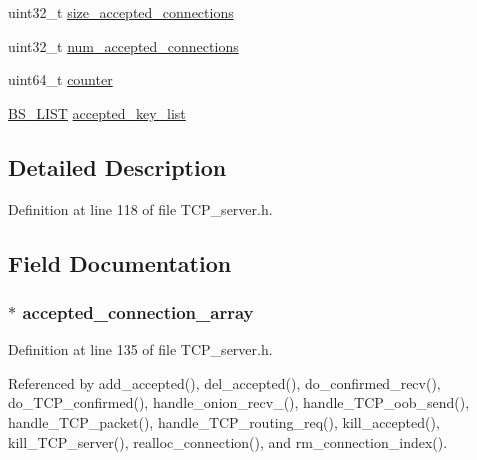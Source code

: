 \begin{DoxyCompactItemize}
\item 
uint32\+\_\+t \hyperlink{struct_t_c_p___server_a6348c77f7067c2876de893aedb559972}{size\+\_\+accepted\+\_\+connections}
\item 
uint32\+\_\+t \hyperlink{struct_t_c_p___server_a77b20b49521cea9c12823bae50db6557}{num\+\_\+accepted\+\_\+connections}
\item 
uint64\+\_\+t \hyperlink{struct_t_c_p___server_a1944753ac8107ec537f75b7e0201d866}{counter}
\item 
\hyperlink{struct_b_s___l_i_s_t}{B\+S\+\_\+\+L\+I\+S\+T} \hyperlink{struct_t_c_p___server_ae01209a4897757539a5ff199cdcfb64c}{accepted\+\_\+key\+\_\+list}
\end{DoxyCompactItemize}


\subsection{Detailed Description}


Definition at line 118 of file T\+C\+P\+\_\+server.\+h.



\subsection{Field Documentation}
\hypertarget{struct_t_c_p___server_aaec24f8b80a7853d1b7da87e903c44ee}{
\subsubsection[{accepted\+\_\+connection\+\_\+array}]{$\ast$ accepted\+\_\+connection\+\_\+array}}\label{struct_t_c_p___server_aaec24f8b80a7853d1b7da87e903c44ee}


Definition at line 135 of file T\+C\+P\+\_\+server.\+h.



Referenced by add\+\_\+accepted(), del\+\_\+accepted(), do\+\_\+confirmed\+\_\+recv(), do\+\_\+\+T\+C\+P\+\_\+confirmed(), handle\+\_\+onion\+\_\+recv\+\_(), handle\+\_\+\+T\+C\+P\+\_\+oob\+\_\+send(), handle\+\_\+\+T\+C\+P\+\_\+packet(), handle\+\_\+\+T\+C\+P\+\_\+routing\+\_\+req(), kill\+\_\+accepted(), kill\+\_\+\+T\+C\+P\+\_\+server(), realloc\+\_\+connection(), and rm\+\_\+connection\+\_\+index().

